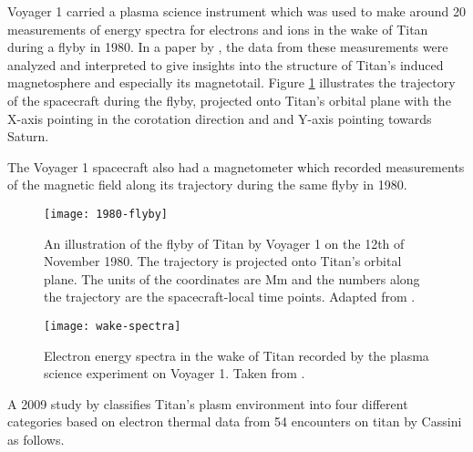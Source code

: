 \documentclass[12pt, parskip=full*, abstract]{scrartcl}
\begin{document}
Voyager 1 carried a plasma science instrument which was used to make around 20 measurements of energy spectra for electrons and ions in the wake of Titan during a flyby in 1980. In a paper by \textcite{hartle-1982}, the data from these measurements were analyzed and interpreted to give insights into the structure of Titan's induced magnetosphere and especially its magnetotail. Figure \ref{1980-flyby} illustrates the trajectory of the spacecraft during the flyby, projected onto Titan's orbital plane with the X-axis pointing in the corotation direction and and Y-axis pointing towards Saturn.

The Voyager 1 spacecraft also had a magnetometer which recorded measurements of the magnetic field along its trajectory during the same flyby in 1980. \textcite{ness-1982}

\begin{figure}[htbp]
	\centering
	\texttt{[image: 1980-flyby]}
	\caption{An illustration of the flyby of Titan by Voyager 1 on the 12th of November 1980. The trajectory is projected onto Titan's orbital plane. The units of the coordinates are \si{\mega\metre} and the numbers along the trajectory are the spacecraft-local time points. Adapted from \textcite{hartle-1982}.}
	\label{1980-flyby}
\end{figure}

\begin{figure}[htbp]
	\centering
	\texttt{[image: wake-spectra]}
	\caption{Electron energy spectra in the wake of Titan recorded by the plasma science experiment on Voyager 1. Taken from \textcite{hartle-1982}.}
	\label{wake-spectra}
\end{figure}

A 2009 study by \textcite{Rymer-class} classifies Titan's plasm environment into four different categories based on electron thermal data from 54 encounters on titan by Cassini as follows. 
\end{document}
